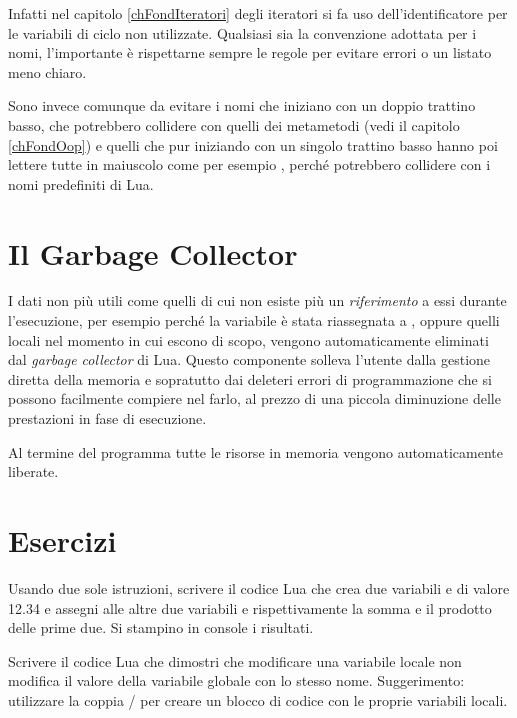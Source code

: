 Infatti nel capitolo \ref{chFondIteratori} degli iteratori si fa uso
dell'identificatore  per le variabili di ciclo non utilizzate.
Qualsiasi sia la convenzione adottata per i nomi, l'importante è rispettarne
sempre le regole per evitare errori o un listato meno chiaro.

Sono invece comunque da evitare i nomi che iniziano con un doppio trattino
basso, che potrebbero collidere con quelli dei metametodi (vedi il capitolo
\ref{chFondOop}) e quelli che pur iniziando con un singolo trattino basso hanno
poi lettere tutte in maiuscolo come per esempio
, perché potrebbero collidere con i nomi
predefiniti di Lua.


\section{Il Garbage Collector}

I dati non più utili come quelli di cui non esiste più un \emph{riferimento} a
essi durante l'esecuzione, per esempio perché la variabile è stata riassegnata a
, oppure quelli locali nel momento in cui escono di scopo, vengono
automaticamente eliminati dal \emph{garbage collector} di Lua. Questo componente
solleva l'utente dalla gestione diretta della memoria e sopratutto dai deleteri
errori di programmazione che si possono facilmente compiere nel farlo, al prezzo
di una piccola diminuzione delle prestazioni in fase di esecuzione.

Al termine del programma tutte le risorse in memoria vengono automaticamente
liberate.


\section{Esercizi}

\begin{Exercise}[label=fond-01]
Usando due sole istruzioni, scrivere il codice Lua che crea due variabili
 e  di valore 12.34 e assegni alle altre due variabili  e
 rispettivamente la somma e il prodotto delle prime due. Si stampino
in console i risultati.
\end{Exercise}

\begin{Exercise}[label=fond-02]
Scrivere il codice Lua che dimostri che modificare una variabile locale non
modifica il valore della variabile globale con lo stesso nome. Suggerimento:
utilizzare la coppia / per creare un blocco di codice con le
proprie variabili locali.
\end{Exercise}

